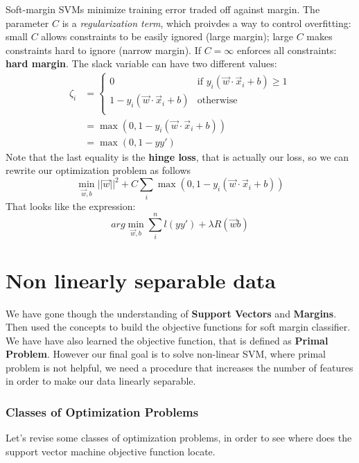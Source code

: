 Soft-margin SVMs minimize training error traded off against margin. The parameter \(C\) is a \emph{regularization term}, which proivdes a way to control overfitting: small \(C\) allows constraints to be easily ignored (large margin); large \(C\) makes constraints hard to ignore (narrow margin). If \(C = \infty\) enforces all constraints: \textbf{hard margin}. The slack variable can have two different values:
\begin{align}
    \zeta_i &= \begin{cases}
        0 &\text{if } y_i(\vec{w} \cdot \vec{x}_i + b) \geq 1\\
        1-y_i(\vec{w} \cdot \vec{x}_i + b) &\text{otherwise}\\
    \end{cases}\\
    &=\max(0, 1-y_i(\vec{w} \cdot \vec{x}_i + b))\\
    &=\max(0,1-yy')
\end{align}
Note that the last equality is the \textbf{hinge loss}, that is actually our loss, so we can rewrite our optimization problem as follows
\begin{equation}
    \min_{\vec{w},b} ||\vec{w}||^2 + C \sum_i \max(0,1-y_i(\vec{w} \cdot \vec{x}_i + b))
\end{equation}
That looks like the expression:
\begin{equation}
    arg \min_{\vec{w},b} \sum_i^n l(yy') + \lambda R(\vec{w} b)
\end{equation}

\section{Non linearly separable data}
We have gone though the understanding of \textbf{Support Vectors} and \textbf{Margins}. Then used the concepts to build the objective functions for soft margin classifier. We have have also learned the objective function, that is defined as \textbf{Primal Problem}. However our final goal is to solve non-linear SVM, where primal problem is not helpful, we need a procedure that increases the number of features in order to make our data linearly separable.

\subsubsection{Classes of Optimization Problems}
Let's revise some classes of optimization problems, in order to see where does the support vector machine objective function locate.

